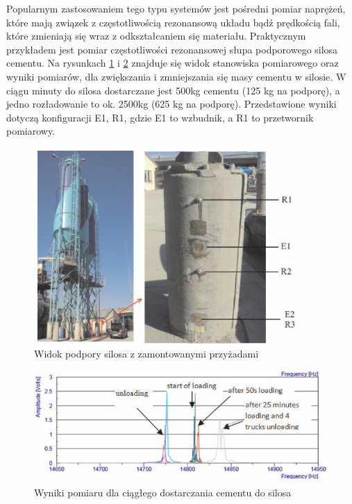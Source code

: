 Popularnym zastosowaniem tego typu systemów jest pośredni pomiar naprężeń, które mają związek z częstotliwością rezonansową układu bądź prędkością fali, które zmieniają się wraz z odkształcaniem się materiału. Praktycznym przykładem jest pomiar częstotliwości rezonansowej słupa podporowego silosa cementu. Na rysunkach \ref{fig:sing_around_silos} i \ref{fig:sing_around_wyniki} znajduje się widok stanowiska pomiarowego oraz wyniki pomiarów, dla zwiększania i zmniejszania się masy cementu w silosie. W ciągu minuty do silosa dostarczane jest 500kg cementu (125 kg na podporę), a jedno rozładowanie to ok. 2500kg (625 kg na podporę). Przedstawione wyniki dotyczą konfiguracji E1, R1, gdzie E1 to wzbudnik, a R1 to przetwornik pomiarowy.

\begin{figure}[h]
\centering
\includegraphics[width=10cm]{Zdjecia/2/sing_around_silos}
\caption{Widok podpory silosa z zamontowanymi przyżadami \cite{bartek_kwach}}
\label{fig:sing_around_silos}
\end{figure}

\begin{figure}[h]
\centering
\includegraphics[width=14cm]{Zdjecia/2/sing_around_wyniki}
\caption{Wyniki pomiaru dla ciągłego dostarczania cementu do silosa \cite{bartek_kwach}}
\label{fig:sing_around_wyniki}
\end{figure}

